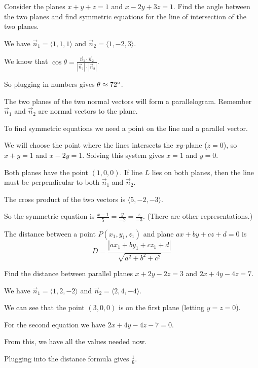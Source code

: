 \documentclass[../calc3.tex]{subfiles}
\begin{document}
\begin{example}
    Consider the planes $x+y+z=1$ and $x-2y+3z=1$. Find the angle between the two planes and find symmetric equations for the line of intersection of the two planes.

    We have $\vec{n}_1=\langle 1,1,1\rangle$ and $\vec{n}_2=\langle 1,-2,3\rangle$.

    We know that $\cos\theta = \frac{\vec{n}_1\cdot \vec{n}_2}{|\vec{n}_1|\cdot |\vec{n}_2|}$.

    So plugging in numbers gives $\theta \approx 72\degree$.

    The two planes of the two normal vectors will form a parallelogram. Remember $\vec{n}_1$ and $\vec{n}_2$ are normal vectors to the plane. 

    To find symmetric equations we need a point on the line and a parallel vector.

    We will choose the point where the lines intersects the $xy$-plane ($z=0$), so $x+y=1$ and $x-2y=1$. Solving this system gives $x=1$ and $y=0$.

    Both planes have the point $(1,0,0)$. If line $L$ lies on both planes, then the line must be perpendicular to both $\vec{n}_1$ and $\vec{n}_2$.

    The cross product of the two vectors is $\langle 5,-2,-3\rangle$.

    So the symmetric equation is $\frac{x-1}{5}=\frac{y}{-2}=\frac{z}{-3}$. (There are other representations.)
\end{example}

\begin{theorem}
    The distance between a point $P(x_1,y_1,z_1)$ and plane $ax+by+cz+d=0$ is 
    \[ D=\frac{|ax_1+by_1+cz_1+d|}{\sqrt{a^2+b^2+c^2}} \]
\end{theorem}

\pagebreak
\begin{example}
    Find the distance between parallel planes $x+2y-2z=3$ and $2x+4y-4z=7$.

    We have $\vec{n}_1=\langle 1,2,-2\rangle$ and $\vec{n}_2=\langle 2,4,-4\rangle$.

    We can see that the point $(3,0,0)$ is on the first plane (letting $y=z=0$).

    For the second equation we have $2x+4y-4z-7=0$.

    From this, we have all the values needed now.

    Plugging into the distance formula gives $\frac{1}{6}$.
\end{example}
\end{document}
